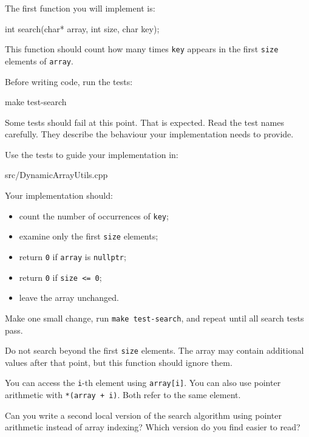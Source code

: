 \documentclass{csc2059practical}
\begin{document}
The first function you will implement is:

\begin{cppcode}
int search(char* array,
           int size,
           char key);
\end{cppcode}

This function should count how many times \texttt{key} appears in the first \texttt{size} elements of \texttt{array}.

Before writing code, run the tests:

\begin{bashcode}
make test-search
\end{bashcode}

Some tests should fail at this point. That is expected. Read the test names carefully. They describe the behaviour your implementation needs to provide.

Use the tests to guide your implementation in:

\begin{terminal}
src/DynamicArrayUtils.cpp
\end{terminal}

Your implementation should:
\begin{itemize}
  \item count the number of occurrences of \texttt{key};
  \item examine only the first \texttt{size} elements;
  \item return \texttt{0} if \texttt{array} is \texttt{nullptr};
  \item return \texttt{0} if \texttt{size <= 0};
  \item leave the array unchanged.
\end{itemize}

Make one small change, run \texttt{make test-search}, and repeat until all search tests pass.

\begin{commonerror}
Do not search beyond the first \texttt{size} elements. The array may contain additional values after that point, but this function should ignore them.
\end{commonerror}

\begin{tipbox}
You can access the \texttt{i}-th element using \texttt{array[i]}. You can also use pointer arithmetic with \texttt{*(array + i)}. Both refer to the same element.
\end{tipbox}

\begin{challengebox}
Can you write a second local version of the search algorithm using pointer arithmetic instead of array indexing? Which version do you find easier to read?
\end{challengebox}
\end{document}

